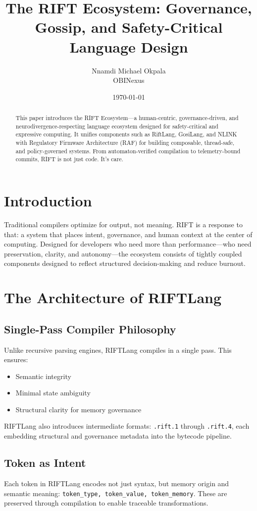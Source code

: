 \documentclass{article}
\title{The RIFT Ecosystem: Governance, Gossip, and Safety-Critical Language Design}
\author{Nnamdi Michael Okpala \\ OBINexus}
\date{\today}
\begin{document}
\maketitle

\begin{abstract}
This paper introduces the RIFT Ecosystem—a human-centric, governance-driven, and neurodivergence-respecting language ecosystem designed for safety-critical and expressive computing. It unifies components such as RiftLang, GosiLang, and NLINK with Regulatory Firmware Architecture (RAF) for building composable, thread-safe, and policy-governed systems. From automaton-verified compilation to telemetry-bound commits, RIFT is not just code. It's care.
\end{abstract}

\section{Introduction}
Traditional compilers optimize for output, not meaning. RIFT is a response to that: a system that places intent, governance, and human context at the center of computing. Designed for developers who need more than performance—who need preservation, clarity, and autonomy—the ecosystem consists of tightly coupled components designed to reflect structured decision-making and reduce burnout.

\section{The Architecture of RIFTLang}
\subsection{Single-Pass Compiler Philosophy}
Unlike recursive parsing engines, RIFTLang compiles in a single pass. This ensures:
\begin{itemize}
    \item Semantic integrity
    \item Minimal state ambiguity
    \item Structural clarity for memory governance
\end{itemize}
RIFTLang also introduces intermediate formats: \texttt{.rift.1} through \texttt{.rift.4}, each embedding structural and governance metadata into the bytecode pipeline.

\subsection{Token as Intent}
Each token in RIFTLang encodes not just syntax, but memory origin and semantic meaning: \texttt{token\_type, token\_value, token\_memory}. These are preserved through compilation to enable traceable transformations.
\end{document}
